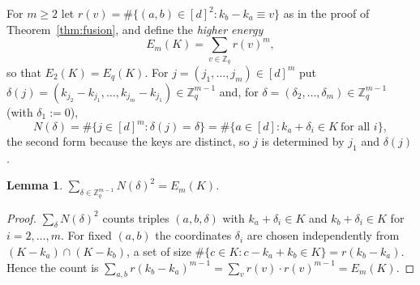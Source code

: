 \documentclass[11pt]{article}
\newcommand{\Z}{\mathbb{Z}}
\newtheorem{lemma}[theorem]{Lemma}
\theoremstyle{definition}
\theoremstyle{remark}
\begin{document}
For $m\ge2$ let $r(v)=\#\{(a,b)\in[d]^2:k_b-k_a\equiv v\}$ as in the proof of Theorem~\ref{thm:fusion}, and define the
\emph{higher energy}
\[
E_m(K)=\sum_{v\in\Z_q}r(v)^m ,
\]
so that $E_2(K)=E_q(K)$. For $j=(j_1,\dots,j_m)\in[d]^m$ put $\delta(j)=(k_{j_2}-k_{j_1},\dots,k_{j_m}-k_{j_1})\in\Z_q^{m-1}$ and,
for $\delta=(\delta_2,\dots,\delta_m)\in\Z_q^{m-1}$ (with $\delta_1:=0$),
\[
N(\delta)=\#\{j\in[d]^m:\delta(j)=\delta\}=\#\{a\in[d]:k_a+\delta_i\in K\ \text{for all } i\},
\]
the second form because the keys are distinct, so $j$ is determined by $j_1$ and $\delta(j)$.

\begin{lemma}\label{lem:Em}
$\sum_{\delta\in\Z_q^{m-1}}N(\delta)^2=E_m(K)$.
\end{lemma}
\begin{proof}
$\sum_\delta N(\delta)^2$ counts triples $(a,b,\delta)$ with $k_a+\delta_i\in K$ and $k_b+\delta_i\in K$ for $i=2,\dots,m$. For fixed $(a,b)$ the
coordinates $\delta_i$ are chosen independently from $(K-k_a)\cap(K-k_b)$, a set of size $\#\{c\in K:c-k_a+k_b\in K\}=r(k_b-k_a)$.
Hence the count is $\sum_{a,b}r(k_b-k_a)^{m-1}=\sum_v r(v)\cdot r(v)^{m-1}=E_m(K)$.
\end{proof}
\end{document}
